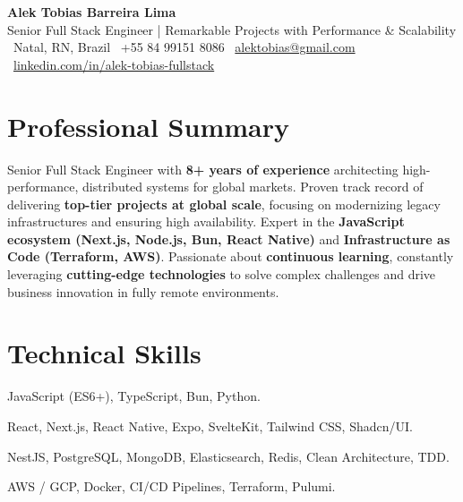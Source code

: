 \documentclass[a4paper,10pt]{article}
\begin{document}
\begin{center}
    {\Huge \textbf{Alek Tobias Barreira Lima}} \\[0.2cm]
    {\Large \color{darkgray} Senior Full Stack Engineer | Remarkable Projects with Performance \& Scalability} \\[0.3cm]
    
    \small
    \faMapMarker* \ Natal, RN, Brazil \quad \textbullet \quad
    \faPhone \ +55 84 99151 8086 \quad \textbullet \quad
    \faEnvelope \ \href{mailto:alektobias@gmail.com}{alektobias@gmail.com}\quad \textbullet \quad
    \faLinkedin \ \href{https://www.linkedin.com/in/alek-tobias-fullstack}{linkedin.com/in/alek-tobias-fullstack}
\end{center}

\vspace{0.2cm}

\section{Professional Summary}
Senior Full Stack Engineer with \textbf{8+ years of experience} architecting high-performance, distributed systems for global markets. Proven track record of delivering \textbf{top-tier projects at global scale}, focusing on modernizing legacy infrastructures and ensuring high availability. Expert in the \textbf{JavaScript ecosystem (Next.js, Node.js, Bun, React Native)} and \textbf{Infrastructure as Code (Terraform, AWS)}. Passionate about \textbf{continuous learning}, constantly leveraging \textbf{cutting-edge technologies} to solve complex challenges and drive business innovation in fully remote environments.

\section{Technical Skills}
\begin{description}[style=multiline, leftmargin=4.2cm, font=\bfseries\color{techblue}]
    \item[Languages \& Runtimes] JavaScript (ES6+), TypeScript, Bun, Python.
    \item[Mobile \& Frontend] React, Next.js, React Native, Expo, SvelteKit, Tailwind CSS, Shadcn/UI.
    \item[Backend \& Data] NestJS, PostgreSQL, MongoDB, Elasticsearch, Redis, Clean Architecture, TDD.
    \item[DevOps \& IaC] AWS / GCP, Docker, CI/CD Pipelines, Terraform, Pulumi.
\end{description}
\end{document}
